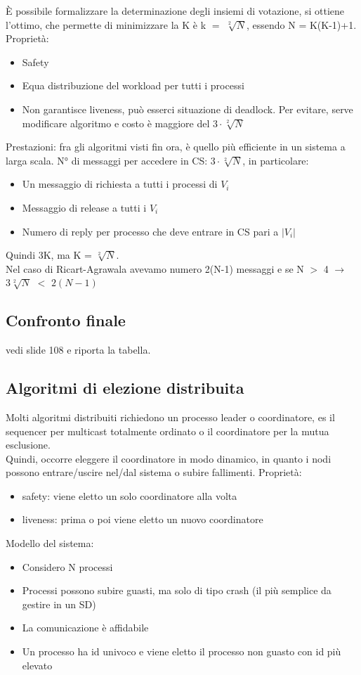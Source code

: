 \documentclass{article}
\begin{document}
È possibile formalizzare la determinazione degli insiemi di votazione, si ottiene l'ottimo, che permette di minimizzare la K è k $=$ $\sqrt[2]{N}$, essendo N = K(K-1)+1.\\ Proprietà:
\begin{itemize}
\item Safety
\item Equa distribuzione del workload per tutti i processi
\item Non garantisce liveness, può esserci situazione di deadlock. Per evitare, serve modificare algoritmo e costo è maggiore del $3\cdot \sqrt[2]{N}$
\end{itemize}
Prestazioni: fra gli algoritmi visti fin ora, è quello più efficiente in un sistema a larga scala. N° di messaggi per accedere in CS: $3\cdot \sqrt[2]{N}$, in particolare:
\begin{itemize}
\item Un messaggio di richiesta a tutti i processi di $V_i$
\item Messaggio di release a tutti i $V_i$
\item Numero di reply per processo che deve entrare in CS pari a $|V_i|$
\end{itemize}
Quindi 3K, ma K = $\sqrt[2]{N}$.\\ Nel caso di Ricart-Agrawala avevamo numero 2(N-1) messaggi e se N $>$ 4 $\rightarrow$ $3\sqrt[2]{N}$ $<$ $2(N-1)$
\subsection{Confronto finale}
vedi slide 108 e riporta la tabella.
\subsection{Algoritmi di elezione distribuita}
Molti algoritmi distribuiti richiedono un processo leader o coordinatore, es il sequencer per multicast totalmente ordinato o il coordinatore per la mutua esclusione.\\ Quindi, occorre eleggere il coordinatore in modo dinamico, in quanto i nodi possono entrare/uscire nel/dal sistema o subire fallimenti. Proprietà:
\begin{itemize}
\item safety: viene eletto un solo coordinatore alla volta
\item liveness: prima o poi viene eletto un nuovo coordinatore
\end{itemize}
Modello del sistema:
\begin{itemize}
\item Considero N processi
\item Processi possono subire guasti, ma solo di tipo crash (il più semplice da gestire in un SD)
\item La comunicazione è affidabile
\item Un processo ha id univoco e viene eletto il processo non guasto con id più elevato
\end{itemize}
\end{document}
